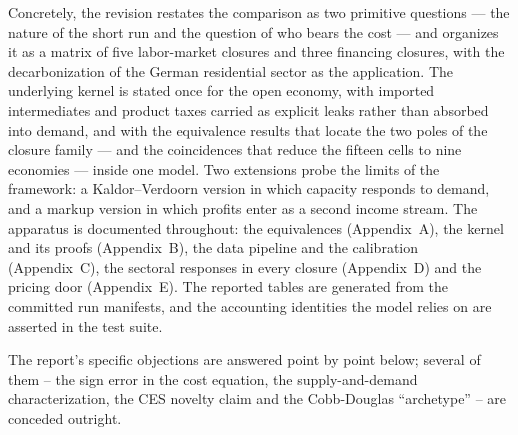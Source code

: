 {Concretely, the revision restates the comparison as two primitive questions --- the
nature of the short run and the question of who bears the cost --- and organizes it
as a matrix of five labor-market closures and three financing closures, with the
decarbonization of the German residential sector as the application. The underlying
kernel is stated once for the open economy, with imported intermediates and product
taxes carried as explicit leaks rather than absorbed into demand, and with the
equivalence results that locate the two poles of the closure family --- and the
coincidences that reduce the fifteen cells to nine economies --- inside one model.
Two extensions probe the limits of the framework: a Kaldor--Verdoorn version in
which capacity responds to demand, and a markup version in which profits enter as a
second income stream. The apparatus is documented throughout: the equivalences
(Appendix~A), the kernel and its proofs (Appendix~B), the data pipeline and the
calibration (Appendix~C), the sectoral responses in every closure (Appendix~D) and the
pricing door (Appendix~E). The reported tables are generated from the committed
run manifests, and the accounting identities the model relies on are asserted in the
test suite.

The report's specific objections are answered point by point below; several of
them -- the sign error in the cost equation, the supply-and-demand
characterization, the CES novelty claim and the Cobb-Douglas ``archetype'' --
are conceded outright.}


